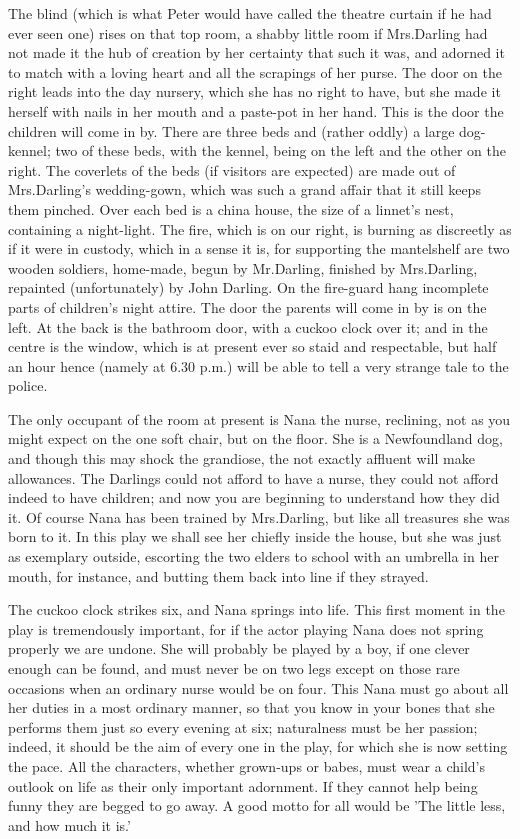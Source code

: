 \begin{stagedir}
The blind
(which is what Peter would have called the theatre curtain if he had ever seen one)
rises on that top room,
a shabby little room if Mrs.\@ Darling had not made it the hub of creation by her certainty that such it was,
and adorned it to match with a loving heart and all the scrapings of her purse.
The door on the right leads into the day nursery,
which she has no right to have, but she made it herself with nails in her mouth and a paste-pot in her hand.
This is the door the children will come in by.
There are three beds and (rather oddly) a large dog-kennel;
two of these beds, with the kennel, being on the left and the other on the right.
The coverlets of the beds (if visitors are expected) are made out of Mrs.\@ Darling's wedding-gown,
which was such a grand affair that it still keeps them pinched.
Over each bed is a china house, the size of a linnet's nest, containing a night-light.
The fire, which is on our right, is burning as discreetly as if it were in custody,
which in a sense it is, for supporting the mantelshelf are two wooden soldiers, home-made,
begun by Mr.\@ Darling, finished by Mrs.\@ Darling, repainted (unfortunately) by John Darling.
On the fire-guard hang incomplete parts of children's night attire.
The door the parents will come in by is on the left.
At the back is the bathroom door, with a cuckoo clock over it;
and in the centre is the window, which is at present ever so staid and respectable,
but half an hour hence (namely at 6.30 p.m.) will be able to tell a very strange tale to the police.

The only occupant of the room at present is Nana the nurse,
reclining, not as you might expect on the one soft chair, but on the floor.
She is a Newfoundland dog, and though this may shock the grandiose,
the not exactly affluent will make allowances.
The Darlings could not afford to have a nurse,
they could not afford indeed to have children;
and now you are beginning to understand how they did it.
Of course Nana has been trained by Mrs.\@ Darling,
but like all treasures she was born to it.
In this play we shall see her chiefly inside the house,
but she was just as exemplary outside,
escorting the two elders to school with an umbrella in her mouth, for instance,
and butting them back into line if they strayed.

The cuckoo clock strikes six, and Nana springs into life.
This first moment in the play is tremendously important,
for if the actor playing Nana does not spring properly we are undone.
She will probably be played by a boy, if one clever enough can be found,
and must never be on two legs except on those rare occasions when an ordinary nurse would be on four.
This Nana must go about all her duties in a most ordinary manner,
so that you know in your bones that she performs them just so every evening at six;
naturalness must be her passion;
indeed, it should be the aim of every one in the play, for which she is now setting the pace.
All the characters, whether grown-ups or babes,
must wear a child's outlook on life as their only important adornment.
If they cannot help being funny they are begged to go away.
A good motto for all would be 'The little less, and how much it is.'


\end{stagedir}
